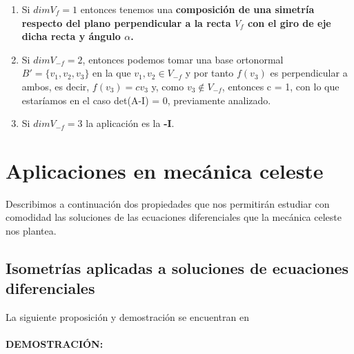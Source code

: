 \documentclass[10pt,a4paper]{article}
\theoremstyle{mystyle}
\newtheorem{prop}{\textcolor{green}{\textbf{Proposición}}}
\begin{document}
\begin{enumerate}
\item Si $dimV_f = 1$ entonces tenemos una \textbf{composición de una simetría respecto del plano perpendicular a la recta $V_f$ con el giro de eje dicha recta y ángulo $\alpha$.}
\item Si $dimV_{-f} = 2$, entonces podemos tomar una base ortonormal $B' = \lbrace v_1,v_2,v_3 \rbrace$ en la que $v_1,v_2 \in V_{-f}$ y por tanto $f(v_3)$ es perpendicular a ambos, es decir, $f(v_3) = cv_3$ y, como $v_3 \notin V_{-f}$, entonces c = 1, con lo que estaríamos en el caso det(A-I) = 0, previamente analizado.
\item Si $dimV_{-f} = 3$ la aplicación es la \textbf{-I}.
\end{enumerate}

\section{Aplicaciones en mecánica celeste}

Describimos a continuación dos propiedades que nos permitirán estudiar con comodidad las soluciones de las ecuaciones diferenciales que la mecánica celeste nos plantea.

\subsection{Isometrías aplicadas a soluciones de ecuaciones diferenciales}

La siguiente proposición y demostración se encuentran en \cite{celeste}\\

\hfill \\

\textbf{DEMOSTRACIÓN:}\\
\end{document}
